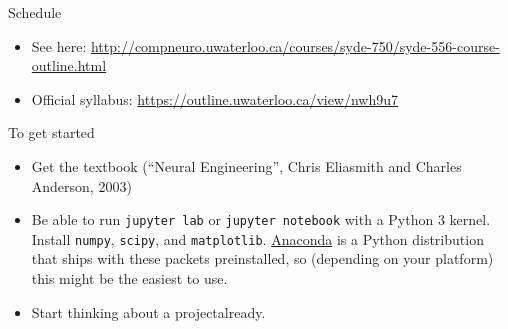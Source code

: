 \documentclass[aspectratio=169]{beamer}
\begin{document}
\begin{frame}{Schedule}
    \begin{itemize}
      \item See here: \url{http://compneuro.uwaterloo.ca/courses/syde-750/syde-556-course-outline.html}
      \item Official syllabus: \url{https://outline.uwaterloo.ca/view/nwh9u7}
    \end{itemize}
\end{frame}

\begin{frame}{To get started}
  \begin{itemize}
    \item Get the textbook (\enquote{Neural Engineering}, Chris Eliasmith and Charles Anderson, 2003)
    \item Be able to run \texttt{jupyter lab} or \texttt{jupyter notebook} with a Python 3 kernel. Install \texttt{numpy}, \texttt{scipy}, and \texttt{matplotlib}. \href{https://www.anaconda.com/distribution/}{Anaconda} is a Python distribution that ships with these packets preinstalled, so (depending on your platform) this might be the easiest to use.
    \item Start thinking about a project\textellipsis already.
  \end{itemize}
\end{frame}
\end{document}

